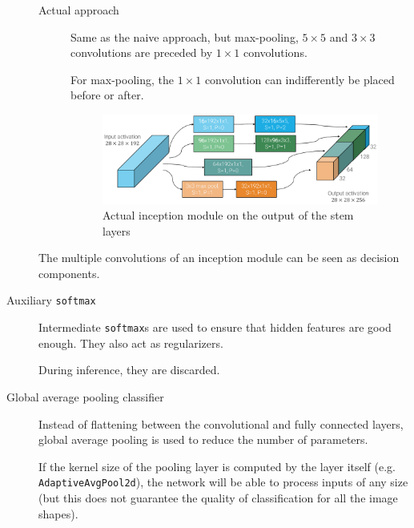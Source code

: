 \begin{description}
\begin{description}
                
            \item[Actual approach] 
                Same as the naive approach, but max-pooling, $5 \times 5$ and $3 \times 3$ convolutions
                are preceded by $1 \times 1$ convolutions.
                
                \begin{remark}
                    For max-pooling, the $1 \times 1$ convolution can indifferently be placed before or after.    
                \end{remark}

                \begin{figure}[H]
                    \centering
                    \includegraphics[width=0.7\linewidth]{./img/_actual_inception.pdf}
                    \caption{Actual inception module on the output of the stem layers}
                \end{figure}
            \end{description}
        \begin{remark}
            The multiple convolutions of an inception module can be seen as decision components.
        \end{remark}

    \item[Auxiliary \texttt{softmax}]
        Intermediate \texttt{softmax}s are used to ensure that hidden features are good enough.
        They also act as regularizers.

        During inference, they are discarded.

    \item[Global average pooling classifier] 
        Instead of flattening between the convolutional and fully connected layers, 
        global average pooling is used to reduce the number of parameters.

        \begin{remark}
            If the kernel size of the pooling layer is computed by the layer itself (e.g. \texttt{AdaptiveAvgPool2d}), 
            the network will be able to process inputs of any size (but this does not guarantee the quality of classification for all the image shapes).
        \end{remark}
    
\end{description}

